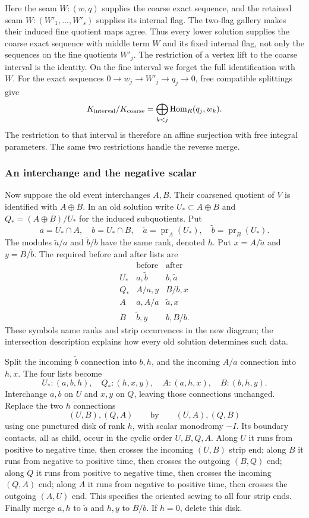 Here the seam $W:(w,q)$ supplies the coarse exact sequence, and the
retained seam $W:(W'_1,\ldots,W'_s)$ supplies its internal flag.
The two-flag gallery makes their induced fine quotient maps agree.
Thus every lower solution supplies the coarse exact sequence with
middle term $W$ and its fixed internal flag, not only the sequences on
the fine quotients $W'_j$.  The restriction of a vertex lift to the coarse
interval is the identity.  On the fine interval we forget the full
identification with $W$.  For the exact sequences
$0\to w_j\to W'_j\to q_j\to0$, free compatible splittings give
\[
 K_{\rm interval}/K_{\rm coarse}
     =\bigoplus_{k<j}\operatorname{Hom}_R(q_j,w_k).
\]
The restriction to that interval is therefore an affine surjection
with free integral parameters.  The same two restrictions handle the
reverse merge.

\subsubsection*{An interchange and the negative scalar}

Now suppose the old event interchanges $A,B$.  Their coarsened
quotient of $V$ is identified with $A\oplus B$.  In an old solution
write $U_*\subset A\oplus B$ and $Q_*=(A\oplus B)/U_*$ for the
induced subquotients.  Put
\[
 a=U_*\cap A,\quad b=U_*\cap B,\quad
 \widetilde a=\operatorname{pr}_A(U_*),\quad
 \widetilde b=\operatorname{pr}_B(U_*).
\]
The modules $\widetilde a/a$ and $\widetilde b/b$ have the same rank,
denoted $h$.  Put $x=A/\widetilde a$ and $y=B/\widetilde b$.
The required before and after lists are
\[
\begin{array}{c|cc}
 &\text{before}&\text{after}\\ \hline
 U_*&a,\widetilde b&b,\widetilde a\\
 Q_*&A/a,y&B/b,x\\
 A&a,A/a&\widetilde a,x\\
 B&\widetilde b,y&b,B/b.
\end{array}
\]
These symbols name ranks and strip occurrences in the new diagram;
the intersection description explains how every old solution
determines such data.

Split the incoming $\widetilde b$ connection into $b,h$, and the
incoming $A/a$ connection into $h,x$.  The four lists become
\[
 U_*:(a,b,h),\quad Q_*:(h,x,y),\quad
 A:(a,h,x),\quad B:(b,h,y).
\]
Interchange $a,b$ on $U$ and $x,y$ on $Q$, leaving those connections
unchanged.  Replace the two $h$ connections
\[
 (U,B),(Q,A)\qquad\text{by}\qquad(U,A),(Q,B)
\]
using one punctured disk of rank $h$, with scalar monodromy $-I$.
Its boundary contacts, all as child, occur in the cyclic order
$U,B,Q,A$.  Along $U$ it runs from positive to negative time,
then crosses the incoming $(U,B)$ strip end; along $B$ it runs
from negative to positive time, then crosses the outgoing $(B,Q)$
end; along $Q$ it runs from positive to negative time, then crosses
the incoming $(Q,A)$ end; along $A$ it runs from negative to positive
time, then crosses the outgoing $(A,U)$ end.  This specifies the
oriented sewing to all four strip ends.  Finally merge $a,h$ to
$\widetilde a$ and $h,y$ to $B/b$.  If $h=0$, delete this disk.

